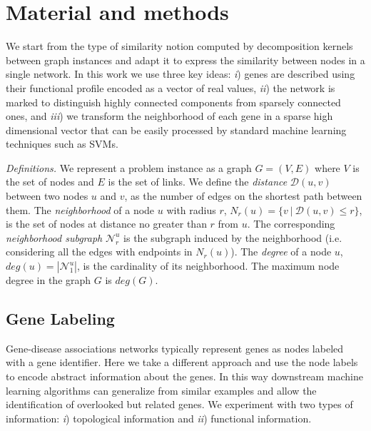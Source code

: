 \documentclass[review]{elsarticle}
\begin{document}
\section{Material and methods}
We start from the type of similarity notion computed by decomposition kernels between graph instances and adapt it to express the similarity between nodes in a single network. In this work we use three key ideas: \textit{i}) genes are described using their functional profile encoded as a vector of real values, \textit{ii}) the network is marked to distinguish highly connected components from sparsely connected ones, and \textit{iii}) we transform the neighborhood of each gene in a sparse high dimensional vector that can be easily processed by standard machine learning techniques such as SVMs.

\textit{Definitions.} 
We represent a problem instance as a graph $G=(V,E)$ where $V$ is the set of nodes and $E$ is the set of links.
We define the \textit{distance} $\mathcal{D}(u,v)$ between two nodes $u$ and $v$, as the number of edges on the shortest path between them. The \textit{neighborhood} of a node $u$ with radius $r$, $N_r(u) = \lbrace v\ |\ \mathcal{D}(u,v) \leq r \rbrace$, is the set of nodes at distance no greater than $r$ from $u$. The corresponding \textit{neighborhood subgraph} $\mathcal{N}_{r}^{u}$ is the  subgraph induced by the neighborhood (i.e. considering all the edges with endpoints in $N_r(u)$). The \textit{degree} of a node $u$, $deg(u) = |\mathcal{N}_{1}^{u}|$, is the cardinality of its neighborhood. The maximum node degree in the graph $G$ is $deg(G)$.


\subsection{Gene Labeling} 
\label{sec:lab}
Gene-disease associations networks typically represent genes as nodes labeled with a gene identifier. Here we take a different approach and use the node labels to encode abstract information about the genes. In this way downstream machine learning algorithms can generalize from similar examples and allow the identification of overlooked but related genes. We experiment with two types of information: \textit{i}) topological information and \textit{ii}) functional information. 
\end{document}
